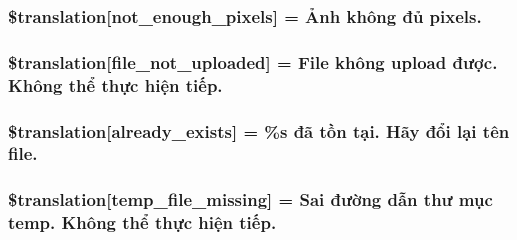 \subsubsection[{\$translation}]{\setlength{\rightskip}{0pt plus 5cm}\$translation\mbox{[}\textquotesingle{}not\+\_\+enough\+\_\+pixels\textquotesingle{}\mbox{]} = \textquotesingle{}Ảnh không đủ pixels.\textquotesingle{}}\label{class_8upload_8vn___v_n_8php_a1fe342c27ce61f4ff4e0120ba647033e}
\hypertarget{class_8upload_8vn___v_n_8php_a4ce76e7be0b3a03c2b47f6d70c21832e}{}
\subsubsection[{\$translation}]{\setlength{\rightskip}{0pt plus 5cm}\$translation\mbox{[}\textquotesingle{}file\+\_\+not\+\_\+uploaded\textquotesingle{}\mbox{]} = \textquotesingle{}File không {\bf upload} được. Không thể thực hiện tiếp.\textquotesingle{}}\label{class_8upload_8vn___v_n_8php_a4ce76e7be0b3a03c2b47f6d70c21832e}
\hypertarget{class_8upload_8vn___v_n_8php_afd84e910217f04139f567c41e292afa5}{}
\subsubsection[{\$translation}]{\setlength{\rightskip}{0pt plus 5cm}\$translation\mbox{[}\textquotesingle{}already\+\_\+exists\textquotesingle{}\mbox{]} = \textquotesingle{}\%s đã tồn tại. Hãy đổi lại tên file.\textquotesingle{}}\label{class_8upload_8vn___v_n_8php_afd84e910217f04139f567c41e292afa5}
\hypertarget{class_8upload_8vn___v_n_8php_ab0fa87a88aba2624004581eed0633325}{}
\subsubsection[{\$translation}]{\setlength{\rightskip}{0pt plus 5cm}\$translation\mbox{[}\textquotesingle{}temp\+\_\+file\+\_\+missing\textquotesingle{}\mbox{]} = \textquotesingle{}Sai đường dẫn thư mục temp. Không thể thực hiện tiếp.\textquotesingle{}}\label{class_8upload_8vn___v_n_8php_ab0fa87a88aba2624004581eed0633325}
\hypertarget{class_8upload_8vn___v_n_8php_aceaaf7355acaaf10f0ae60378d03c468}{}
